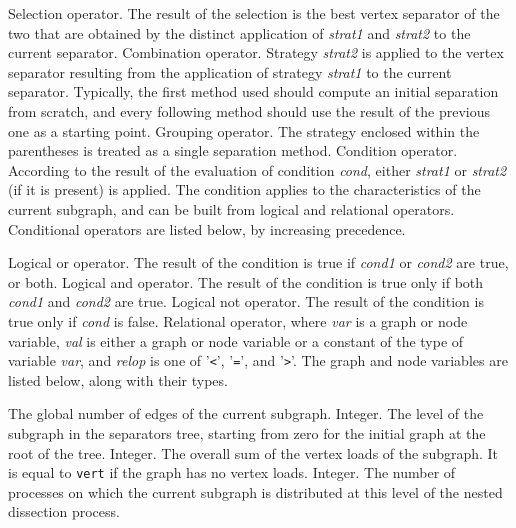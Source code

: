 \begin{itemize}
Selection operator. The result of the selection is the best vertex separator of
the two that are obtained by the distinct application of {\it strat1\/} and
{\it strat2\/} to the current separator.
Combination operator. Strategy {\it strat2\/} is applied to the vertex
separator resulting from the application of strategy {\it strat1\/} to the
current separator. Typically, the first method used should compute an initial
separation from scratch, and every following method should use the
result of the previous one as a starting point.
\iteme[{\tt (}{\it strat\/}{\tt )}]
Grouping operator.
The strategy enclosed within the parentheses is treated as a single
separation method.
Condition operator. According to the result of the evaluation of condition
{\it cond}, either {\it strat1\/} or {\it strat2\/} (if it is present) is
applied. The condition applies to the characteristics of the current subgraph,
and can be built from logical and relational operators. Conditional
operators are listed below, by increasing precedence.
\begin{itemize}
Logical or operator. The result of the condition is true if {\it cond1\/}
or {\it cond2\/} are true, or both.
Logical and operator. The result of the condition is true only if both
{\it cond1\/} and {\it cond2\/} are true.
\iteme[{\tt !}{\it cond}]
Logical not operator. The result of the condition is true only if
{\it cond\/} is false.
Relational operator, where {\it var\/} is a graph or node variable,
{\it val\/} is either a graph or node variable or a constant of the type of
variable {\it var\/}, and {\it relop\/} is one of
'{\tt\verb+<+}', '{\tt\verb+=+}', and '{\tt\verb+>+}'.
The graph and node variables are listed below, along with their types.
\begin{itemize}
\iteme[{\tt edge}]
The global number of edges of the current subgraph.
Integer.
\iteme[{\tt levl}]
The level of the subgraph in the separators tree, starting from zero
for the initial graph at the root of the tree.
Integer.
\iteme[{\tt load}]
The overall sum of the vertex loads of the subgraph. It is equal to
{\tt vert} if the graph has no vertex loads.
Integer.
\iteme[{\tt proc}]
The number of processes on which the current subgraph is distributed
at this level of the nested dissection process.

\end{itemize}
\end{itemize}
\end{itemize}
